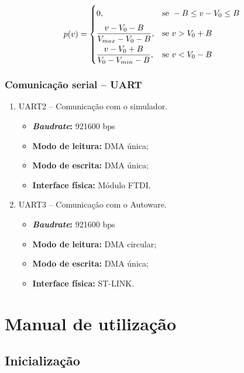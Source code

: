\begin{equation}\label{eq:joy}
	p(v) = \begin{dcases}
		0\vphantom{\frac{0}{0}}, &\text{se } - B \le v - V_0 \le B \\
		\frac{v - V_0 - B}{V_{max} - V_0 - B}, &\text{se } v > V_0 + B \\
		\frac{v - V_0 + B}{V_0 - V_{min} - B}, &\text{se } v < V_0 - B 
	\end{dcases}
\end{equation}

\subsubsection*{Comunicação serial -- UART}

	\begin{enumerate}
		\item UART2 -- Comunicação com o simulador.
		\begin{itemize}
			\item \textbf{\textit{Baudrate}:} 921600 bps
			\item \textbf{Modo de leitura:} DMA única;
			\item \textbf{Modo de escrita:} DMA única;
			\item \textbf{Interface física:} Módulo FTDI.	
		\end{itemize}
	
		\item UART3 -- Comunicação com o Autoware.
		\begin{itemize}
			\item \textbf{\textit{Baudrate}:} 921600 bps
			\item \textbf{Modo de leitura:} DMA circular;
			\item \textbf{Modo de escrita:} DMA única;
			\item \textbf{Interface física:} ST-LINK.		
		\end{itemize}	
	
	\end{enumerate}

\clearpage

\section{Manual de utilização}

\subsection{Inicialização}

